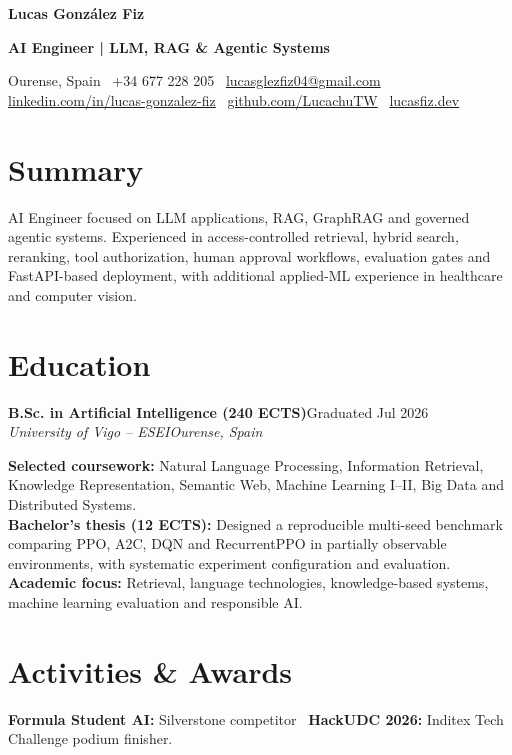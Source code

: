 \documentclass[10pt,a4paper]{article}
\newcommand{\entry}[4]{
  \textbf{#1}\hfill{\small #2}\\[-1pt]
  \textit{#3}\hfill{\small\textit{#4}}\par\vspace{-1.5pt}
}
\begin{document}
{\fontsize{26.5pt}{28pt}\selectfont\bfseries\color{ink} Lucas Gonz\'alez Fiz}\par
\vspace{1pt}
{\fontsize{12.5pt}{14pt}\selectfont\bfseries\color{accent} AI Engineer | LLM, RAG \& Agentic Systems}\par
\vspace{3pt}
{\small
Ourense, Spain \textbar\ +34 677 228 205 \textbar\
\href{mailto:lucasglezfiz04@gmail.com}{lucasglezfiz04@gmail.com}\\[-1pt]
\href{https://linkedin.com/in/lucas-gonzalez-fiz}{linkedin.com/in/lucas-gonzalez-fiz} \textbar\
\href{https://github.com/LucachuTW}{github.com/LucachuTW} \textbar\
\href{https://lucasfiz.dev}{lucasfiz.dev}
}

\section{Summary}
AI Engineer focused on LLM applications, RAG, GraphRAG and governed agentic systems. Experienced in access-controlled retrieval, hybrid search, reranking, tool authorization, human approval workflows, evaluation gates and FastAPI-based deployment, with additional applied-ML experience in healthcare and computer vision.

\section{Education}
\entry{B.Sc. in Artificial Intelligence (240 ECTS)}{Graduated Jul 2026}{University of Vigo -- ESEI}{Ourense, Spain}
\textbf{Selected coursework:} Natural Language Processing, Information Retrieval, Knowledge Representation, Semantic Web, Machine Learning I--II, Big Data and Distributed Systems.\\[-1pt]
\textbf{Bachelor's thesis (12 ECTS):} Designed a reproducible multi-seed benchmark comparing PPO, A2C, DQN and RecurrentPPO in partially observable environments, with systematic experiment configuration and evaluation.\\[-1pt]
\textbf{Academic focus:} Retrieval, language technologies, knowledge-based systems, machine learning evaluation and responsible AI.\\[-1pt]
\section{Activities \& Awards}
\textbf{Formula Student AI:} Silverstone competitor \textbar\ \textbf{HackUDC 2026:} Inditex Tech Challenge podium finisher.
\end{document}
